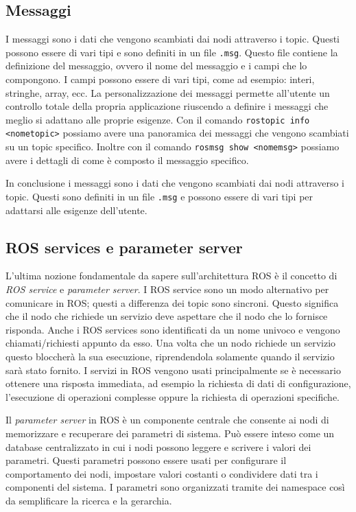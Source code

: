 \subsection{Messaggi}
\label{subsec:messaggi}
I messaggi sono i dati che vengono scambiati dai nodi attraverso i topic. Questi possono essere di vari tipi e sono definiti in un file \verb+.msg+. Questo file contiene la definizione del messaggio, ovvero il nome del messaggio e i campi che lo compongono. I campi possono essere di vari tipi, come ad esempio: interi, stringhe, array, ecc.
La personalizzazione dei messaggi permette all'utente un controllo totale della propria applicazione riuscendo a definire i messaggi che meglio si adattano alle proprie esigenze.
Con il comando \verb+rostopic info <nometopic>+ possiamo avere una panoramica dei messaggi che vengono scambiati su un topic specifico. Inoltre con il comando \verb+rosmsg show <nomemsg>+ possiamo avere i dettagli di come è composto il messaggio specifico.

In conclusione i messaggi sono i dati che vengono scambiati dai nodi attraverso i topic. Questi sono definiti in un file \verb+.msg+ e possono essere di vari tipi per adattarsi alle esigenze dell'utente.
\subsection{ROS services e parameter server}
\label{subsec:servandparam}
L'ultima nozione fondamentale da sapere sull'architettura ROS è il concetto di \textit{ROS service} e \textit{parameter server}. I ROS service sono un modo alternativo per comunicare in ROS; questi a differenza dei topic sono sincroni. Questo significa che il nodo che richiede un servizio deve aspettare che il nodo che lo fornisce risponda. 
Anche i ROS services sono identificati da un nome univoco e vengono chiamati/richiesti appunto da esso. Una volta che un nodo richiede un servizio questo bloccherà la sua esecuzione, riprendendola solamente quando il servizio sarà stato fornito.
I servizi in ROS vengono usati principalmente se è necessario ottenere una risposta immediata, ad esempio la richiesta di dati di configurazione, l'esecuzione di operazioni complesse oppure la richiesta di operazioni specifiche.

Il \textit{parameter server} in ROS è un componente centrale che consente ai nodi di memorizzare e recuperare dei parametri di sistema. Può essere inteso come un database centralizzato in cui i nodi possono leggere e scrivere i valori dei parametri.
Questi parametri possono essere usati per configurare il comportamento dei nodi, impostare valori costanti o condividere dati tra i componenti del sistema. I parametri sono organizzati tramite dei namespace così da semplificare la ricerca e la gerarchia.

